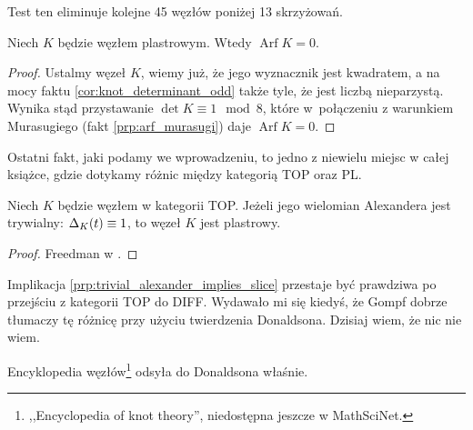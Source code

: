 Test ten eliminuje kolejne 45 węzłów poniżej 13 skrzyżowań.

\begin{proposition}
    Niech $K$ będzie węzłem plastrowym.
    Wtedy $\operatorname{Arf} K = 0$.
\end{proposition}

\begin{proof}
    Ustalmy węzeł $K$, wiemy już, że jego wyznacznik jest kwadratem, a na mocy faktu \ref{cor:knot_determinant_odd} także tyle, że jest liczbą nieparzystą.
    Wynika stąd przystawanie $\det K \equiv 1 \mod 8$, które w~połączeniu z warunkiem Murasugiego (fakt \ref{prp:arf_murasugi}) daje $\operatorname{Arf} K = 0$.
\end{proof}


Ostatni fakt, jaki podamy we wprowadzeniu, to jedno z niewielu miejsc w całej książce, gdzie dotykamy różnic między kategorią TOP oraz PL.

\begin{proposition}
\label{prp:trivial_alexander_implies_slice}%
    Niech $K$ będzie węzłem w kategorii TOP.
    Jeżeli jego wielomian Alexandera jest trywialny: $\Delta_K(t) \equiv 1$, to węzeł $K$ jest plastrowy.
\end{proposition}

\begin{proof}
%
    Freedman w \cite[tw. 1.13]{freedman82}.
\end{proof}

Implikacja \ref{prp:trivial_alexander_implies_slice} przestaje być prawdziwa po przejściu z kategorii TOP do DIFF.
Wydawało mi się kiedyś, że Gompf \cite{gompf86} dobrze tłumaczy tę różnicę przy użyciu twierdzenia Donaldsona.
%
Dzisiaj wiem, że nic nie wiem.

Encyklopedia węzłów\footnote{,,Encyclopedia of knot theory'', niedostępna jeszcze w MathSciNet.} \cite{citation_missing_on_purpose} odsyła do Donaldsona \cite{donaldson83} właśnie.









